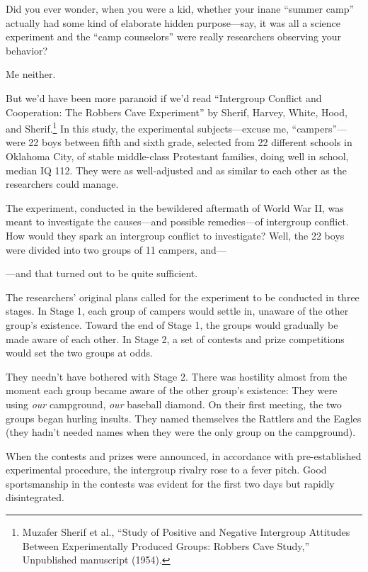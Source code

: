 \myendsectiontext


{
 Did you ever wonder, when you were a kid, whether your inane
``summer camp'' actually had some
kind of elaborate hidden purpose---say, it was all a science experiment
and the ``camp counselors'' were
really researchers observing your behavior? }

{
 Me neither.}

{
 But we'd have been more paranoid if
we'd read ``Intergroup Conflict and
Cooperation: The Robbers Cave Experiment'' by Sherif,
Harvey, White, Hood, and Sherif.\footnote{Muzafer Sherif et al., ``Study of Positive and
Negative Intergroup Attitudes Between Experimentally Produced Groups:
Robbers Cave Study,'' Unpublished manuscript (1954).} In this study, the
experimental subjects---excuse me,
``campers''---were 22 boys between
fifth and sixth grade, selected from 22 different schools in Oklahoma
City, of stable middle-class Protestant families, doing well in school,
median IQ 112. They were as well-adjusted and as similar to each other
as the researchers could manage.}

{
 The experiment, conducted in the bewildered aftermath of World War
II, was meant to investigate the causes---and possible remedies---of
intergroup conflict. How would they spark an intergroup conflict to
investigate? Well, the 22 boys were divided into two groups of 11
campers, and---}

{
 {}---and that turned out to be quite sufficient.}

{
 The researchers' original plans called for the
experiment to be conducted in three stages. In Stage 1, each group of
campers would settle in, unaware of the other group's
existence. Toward the end of Stage 1, the groups would gradually be
made aware of each other. In Stage 2, a set of contests and prize
competitions would set the two groups at odds.}

{
 They needn't have bothered with Stage 2. There was
hostility almost from the moment each group became aware of the other
group's existence: They were using \textit{our}
campground, \textit{our} baseball diamond. On their first meeting, the
two groups began hurling insults. They named themselves the Rattlers
and the Eagles (they hadn't needed names when they were
the only group on the campground).}

{
 When the contests and prizes were announced, in accordance with
pre-established experimental procedure, the intergroup rivalry rose to
a fever pitch. Good sportsmanship in the contests was evident for the
first two days but rapidly disintegrated.}


